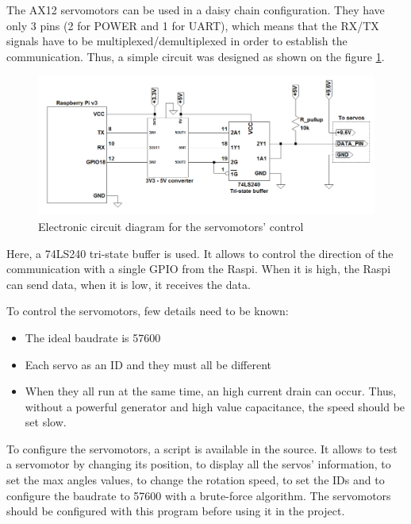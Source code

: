 \documentclass{article}
\newcommand{\vsp}{\vspace{\baselineskip}}
\begin{document}
\vsp

The AX12 servomotors can be used in a daisy chain configuration. They have only 3 pins (2 for POWER and 1 for UART), which means that the RX/TX signals have to be multiplexed/demultiplexed in order to establish the communication. Thus, a simple circuit was designed as shown on the figure \ref{fig:elec_sch_servos}. 

\begin{figure}[H]
    \centering
    \includegraphics[width = \textwidth]{images/elec_sch_servo.png}
    \caption{Electronic circuit diagram for the servomotors' control}
    \label{fig:elec_sch_servos}
\end{figure}


Here, a 74LS240 tri-state buffer is used. It allows to control the direction of the communication with a single GPIO from the Raspi. When it is high, the Raspi can send data, when it is low, it receives the data. 

\vsp

To control the servomotors, few details need to be known:
\begin{itemize}
    \item The ideal baudrate is 57600
    \item Each servo as an ID and they must all be different
    \item When they all run at the same time, an high current drain can occur. Thus, without a powerful generator and high value capacitance, the speed should be set slow.
\end{itemize}

To configure the servomotors, a script is available in the source. It allows to test a servomotor by changing its position, to display all the servos' information, to set the max angles values, to change the rotation speed, to set the IDs and to configure the baudrate to 57600 with a brute-force algorithm. The servomotors should be configured with this program before using it in the project.
\end{document}
